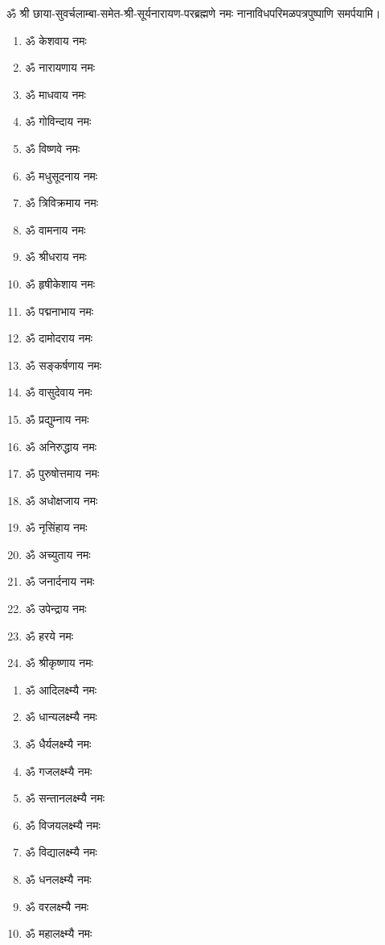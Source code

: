 \begin{center}
\begin{multicols}{2}
\begin{enumerate}
\end{enumerate}
\end{multicols}
ॐ श्री छाया-सुवर्चलाम्बा-समेत-श्री-सूर्यनारायण-परब्रह्मणे नमः नानाविधपरिमळपत्रपुष्पाणि समर्पयामि। \medskip


\begin{multicols}{2}
\begin{enumerate}
\item ॐ केशवाय नमः
\item ॐ नारायणाय नमः
\item ॐ माधवाय नमः
\item ॐ गोविन्दाय नमः
\item ॐ विष्णवे नमः	
\item ॐ मधुसूदनाय नमः
\item ॐ त्रिविक्रमाय नमः
\item ॐ वामनाय नमः
\item ॐ श्रीधराय नमः
\item ॐ हृषीकेशाय नमः
\item ॐ पद्मनाभाय नमः
\item ॐ दामोदराय नमः
\item ॐ सङ्कर्षणाय नमः
\item ॐ वासुदेवाय नमः
\item ॐ प्रद्युम्नाय नमः
\item ॐ अनिरुद्धाय नमः
\item ॐ पुरुषोत्तमाय नमः
\item ॐ अधोक्षजाय नमः
\item ॐ नृसिंहाय नमः
\item ॐ अच्युताय नमः
\item ॐ जनार्दनाय नमः
\item ॐ उपेन्द्राय नमः 
\item ॐ हरये नमः
\item ॐ श्रीकृष्णाय नमः
\end{enumerate}
\end{multicols}


\begin{multicols}{2}
\begin{enumerate}
\item ॐ आदिलक्ष्म्यै नमः
\item ॐ धान्यलक्ष्म्यै नमः
\item ॐ धैर्यलक्ष्म्यै नमः
\item ॐ गजलक्ष्म्यै नमः
\item ॐ सन्तानलक्ष्म्यै नमः
\item ॐ विजयलक्ष्म्यै नमः
\item ॐ विद्यालक्ष्म्यै नमः
\item ॐ धनलक्ष्म्यै नमः
\item ॐ वरलक्ष्म्यै नमः
\item ॐ महालक्ष्म्यै नमः 
\end{enumerate}
\end{multicols}


\end{center}
